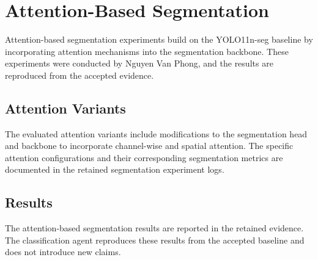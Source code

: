 
\section{Attention-Based Segmentation}
\label{sec:attention-segmentation}

Attention-based segmentation experiments build on the YOLO11n-seg baseline by incorporating attention mechanisms into the segmentation backbone. These experiments were conducted by Nguyen Van Phong, and the results are reproduced from the accepted evidence.

\subsection{Attention Variants}
\label{sec:attention-variants}

The evaluated attention variants include modifications to the segmentation head and backbone to incorporate channel-wise and spatial attention. The specific attention configurations and their corresponding segmentation metrics are documented in the retained segmentation experiment logs.

\subsection{Results}
\label{sec:attention-seg-results}

The attention-based segmentation results are reported in the retained evidence. The classification agent reproduces these results from the accepted baseline and does not introduce new claims.